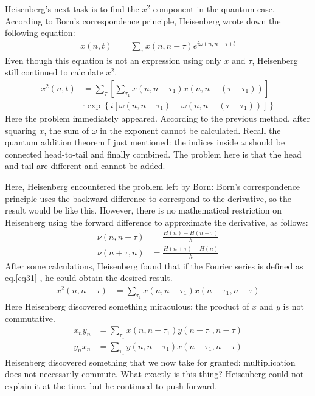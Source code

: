 \documentclass[a4paper, 12pt, oneside, onecolumn]{article}
\begin{document}
\begin{multicols}{2}
Heisenberg's next task is to find the $x^2$ component in the quantum case. According to Born's correspondence principle, Heisenberg wrote down the following equation:
\begin{align}
	x \left( n, t \right)
	&= \sum_\tau x \left( n, n - \tau \right) e^{i \omega \left( n, n - \tau \right) t}
\end{align}
Even though this equation is not an expression using only $x$ and $\tau$, Heisenberg still continued to calculate $x^2$.
\begin{align}
	x^2 \left( n, t \right)
	&= \sum_\tau \left[ \sum_{\tau_1} x \left( n, n - \tau_1 \right) x \left( n, n - \left( \tau -  \tau_1 \right) \right) \right] \nonumber \\
	& \cdot \exp \left\{ i \left[ \omega \left( n, n - \tau_1 \right) + \omega \left( n, n - \left( \tau - \tau_1 \right) \right) \right] \right\}
\end{align}
Here the problem immediately appeared. According to the previous method, after squaring $x$, the sum of $\omega$ in the exponent cannot be calculated. Recall the quantum addition theorem I just mentioned: the indices inside $\omega$ should be connected head-to-tail and finally combined. The problem here is that the head and tail are different and cannot be added.

Here, Heisenberg encountered the problem left by Born: Born's correspondence principle uses the backward difference to correspond to the derivative, so the result would be like this. However, there is no mathematical restriction on Heisenberg using the forward difference to approximate the derivative, as follows:
\begin{align}
	\nu \left( n, n - \tau \right)
	&= \frac{H \left( n \right) - H \left( n - \tau \right) }{h} \label{eq29} \\
	\nu \left( n + \tau , n \right)
	&= \frac{H \left( n + \tau \right) - H \left( n \right) }{h} \label{eq30}
\end{align}
After some calculations, Heisenberg found that if the Fourier series is defined as eq.\ref{eq31} , he could obtain the desired result.
\begin{align}
	x^2 \left( n, n - \tau \right)
	&= \sum_{\tau_1}  x \left( n, n - \tau_1 \right) x \left( n - \tau_1, n - \tau \right) \label{eq31}
\end{align}
Here Heisenberg discovered something miraculous: the product of $x$ and $y$ is not commutative.
\begin{align}
	x_n y_n
	&= \sum_{\tau_1}  x \left( n, n - \tau_1 \right) y \left( n - \tau_1, n - \tau \right) \label{eq32} \\
	y_n x_n
	&= \sum_{\tau_1}  y \left( n, n - \tau_1 \right) x \left( n - \tau_1, n - \tau \right) \label{eq33}
\end{align}
Heisenberg discovered something that we now take for granted: multiplication does not necessarily commute. What exactly is this thing? Heisenberg could not explain it at the time, but he continued to push forward.


\end{multicols}
\end{document}

